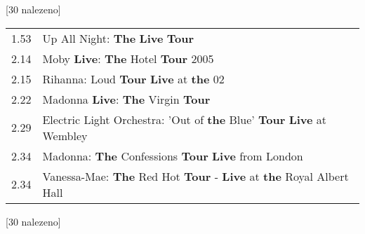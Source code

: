 \begin{table}[H]
\begin{tt}

\horizlina

\noindent
\begin{minipage}[t]{.5\textwidth}\vspace{0pt}
 [30 nalezeno]\vspace{5pt}

\begin{tabulary}{1.1\textwidth}{LL}
1.53 & Up All Night: {\color{red}\textbf{The}} {\color{red}\textbf{Live}} {\color{red}\textbf{Tour}} \\
2.14 & Moby {\color{red}\textbf{Live}}: {\color{red}\textbf{The}} Hotel {\color{red}\textbf{Tour}} 2005 \\
2.15 & Rihanna: Loud {\color{red}\textbf{Tour}} {\color{red}\textbf{Live}} at {\color{red}\textbf{the}} 02 \\
2.22 & Madonna {\color{red}\textbf{Live}}: {\color{red}\textbf{The}} Virgin {\color{red}\textbf{Tour}} \\
2.29 & Electric Light Orchestra: 'Out of {\color{red}\textbf{the}} Blue' {\color{red}\textbf{Tour}} {\color{red}\textbf{Live}} at Wembley \\
2.34 & Madonna: {\color{red}\textbf{The}} Confessions {\color{red}\textbf{Tour}} {\color{red}\textbf{Live}} from London \\
2.34 & Vanessa-Mae: {\color{red}\textbf{The}} Red Hot {\color{red}\textbf{Tour}} - {\color{red}\textbf{Live}} at {\color{red}\textbf{the}} Royal Albert Hall \\
\end{tabulary}
\end{minipage}
\begin{minipage}[t]{.5\textwidth}\vspace{0pt}
 [30 nalezeno]\vspace{5pt}


\end{minipage}
\end{tt}
\end{table}
